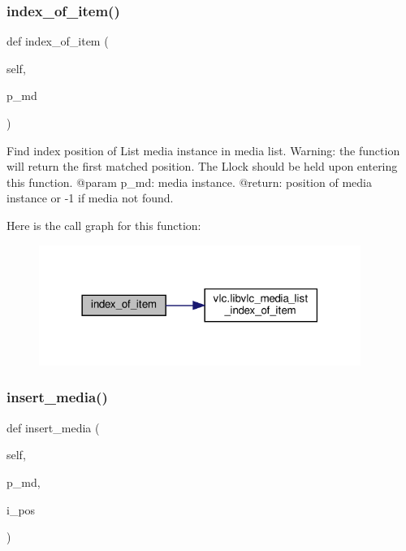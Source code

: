 \subsubsection{\texorpdfstring{index\+\_\+of\+\_\+item()}{index\_of\_item()}}
{\footnotesize\ttfamily def index\+\_\+of\+\_\+item (\begin{DoxyParamCaption}\item[{}]{self,  }\item[{}]{p\+\_\+md }\end{DoxyParamCaption})}

\begin{DoxyVerb}Find index position of List media instance in media list.
Warning: the function will return the first matched position.
The L{lock} should be held upon entering this function.
@param p_md: media instance.
@return: position of media instance or -1 if media not found.
\end{DoxyVerb}
 Here is the call graph for this function\+:
\nopagebreak
\begin{figure}[H]
\begin{center}
\leavevmode
\includegraphics[width=297pt]{classvlc_1_1_media_list_ac1a99349b013539c8620478519a72f81_cgraph}
\end{center}
\end{figure}
\mbox{\label{classvlc_1_1_media_list_aa87d8a88365b1fa73a9c947a264aec7b}} 
\subsubsection{\texorpdfstring{insert\+\_\+media()}{insert\_media()}}
{\footnotesize\ttfamily def insert\+\_\+media (\begin{DoxyParamCaption}\item[{}]{self,  }\item[{}]{p\+\_\+md,  }\item[{}]{i\+\_\+pos }\end{DoxyParamCaption})}

